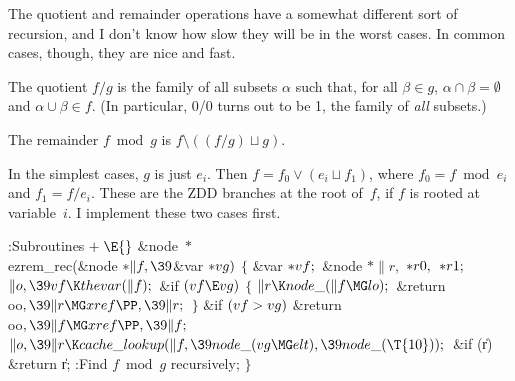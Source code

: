 The quotient and remainder operations have a somewhat
different
sort of recursion, and I don't know how slow they will be in
the worst cases. In common cases, though, they are nice and fast.

The quotient $f/g$ is the family of all subsets $\alpha$ such that,
for all $\beta\in g$, $\alpha\cap\beta=\emptyset$ and $\alpha\cup\beta\in f$.
(In particular, 0/0 turns out to be 1, the family of {\it all\/} subsets.)

The remainder $f\bmod g$ is $f\setminus((f/g)\sqcup g)$.

In the simplest cases, $g$ is just $e_i$. Then $f=f_0\lor(e_i\sqcup f_1)$,
where $f_0=f\bmod e_i$ and $f_1=f/e_i$. These are the ZDD branches
at the root of~$f$, if $f$ is rooted at variable~$i$.
I implement these two cases first.

\Y\B\4:Subroutines\X${}\mathrel+\E{}$\6
\&{node} ${}{*}{}$\\{ezrem\_rec}(\&{node} ${}{*}\|f,\39{}$\&{var} ${}{*}%
\\{vg}){}$\1\1\2\2\6
${}\{{}$\1\6
\&{var} ${}{*}\\{vf};{}$\6
\&{node} ${}{*}\|r,{}$ ${}{*}\\{r0},{}$ ${}{*}\\{r1};{}$\7
${}\|o,\39\\{vf}\K\\{thevar}(\|f);{}$\6
\&{if} ${}(\\{vf}\E\\{vg}){}$\5
${}\{{}$\1\6
${}\|r\K\\{node\_}(\|f\MG\\{lo});{}$\6
\&{return} \\{oo}${},\39\|r\MG\\{xref}\PP,\39\|r;{}$\6
\4${}\}{}$\2\6
\&{if} ${}(\\{vf}>\\{vg}){}$\1\5
\&{return} \\{oo}${},\39\|f\MG\\{xref}\PP,\39\|f;{}$\2\6
${}\|o,\39\|r\K\\{cache\_lookup}(\|f,\39\\{node\_}(\\{vg}\MG\\{elt}),\39\\{node%
\_}(\T{10}));{}$\6
\&{if} (\|r)\1\5
\&{return} \|r;\2\6
:Find $f\bmod g$ recursively\X;\6
\4${}\}{}$\2\par
\fi

